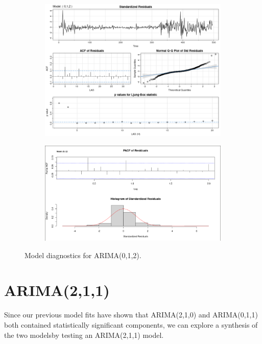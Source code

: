 \documentclass[12pt]{article}
\begin{document}
\begin{figure}[h!]
\centering

\begin{subfigure}[b]{0.6\textwidth}
\centering
\includegraphics[width=1\textwidth]{images/arima_012.png}
\label{fig:sub1}
\end{subfigure}

\begin{subfigure}[b]{0.6\textwidth}
\centering
\includegraphics[width=1\textwidth]{images/arima_012_examine.png}
\label{fig:sub2}
\end{subfigure}

\caption{Model diagnostics for ARIMA(0,1,2).}
\label{fig:test}
\end{figure}

\section{ARIMA(2,1,1)}
Since our previous model fits have shown that ARIMA(2,1,0) and ARIMA(0,1,1) both contained statistically significant components, we can explore a synthesis of the two modelsby testing an ARIMA(2,1,1) model. 
\end{document}

